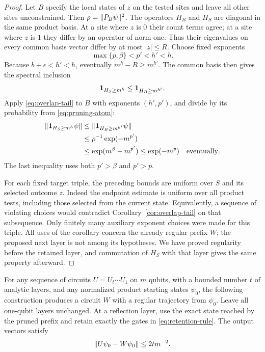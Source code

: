 \begin{proof}
Let $B$ specify the local states of $z$ on the tested sites and leave
all other sites unconstrained.  Then $\rho=\lVert P_B\psi\rVert^2$.
The operators $H_B$ and $H_S$ are diagonal in the same product basis.
At a site where $z$ is $0$ their count terms agree; at a site where
$z$ is $1$ they differ by an operator of norm one.  Thus their
eigenvalues on every common basis vector differ by at most
$|z|\le R$.  Choose fixed exponents
\[
 \max\{p,\beta\}<p'<h'<h.
\]
Because $b+\epsilon<h'<h$, eventually
$m^h-R\ge m^{h'}$.  The common basis then gives the spectral inclusion
\[
 \mathbf 1_{H_S\ge m^h}\le\mathbf 1_{H_B\ge m^{h'}}.
\]
Apply \eqref{eq:overlap-tail} to $B$ with exponents $(h',p')$, and
divide by its probability from \eqref{eq:pruning-atom}:
\begin{align*}
 \lVert\mathbf 1_{H_S\ge m^h}\psi\rVert
 &\le\lVert\mathbf 1_{H_B\ge m^{h'}}\psi\rVert\\
 &\le\rho^{-1}\exp(-m^{p'})\\
 &\le\exp(m^{\beta}-m^{p'})
 \le\exp(-m^p)
 \quad\text{eventually}.
\end{align*}
The last inequality uses both $p'>\beta$ and $p'>p$.

For each fixed target triple, the preceding bounds are uniform over
$S$ and its selected outcome $z$.  Indeed the endpoint estimate is
uniform over all product tests, including those selected from the
current state.  Equivalently, a sequence of violating choices would
contradict Corollary~\ref{cor:overlap-tail} on that subsequence.  Only
finitely many auxiliary exponent choices were made for this triple.
All uses of the corollary concern the already regular prefix $W$;
the proposed next layer is not among its hypotheses.  We have proved
regularity before the retained layer, and commutation of $H_S$ with
that layer gives the same property afterward.
\end{proof}

\begin{proposition}\label{prop:pruning}
For any sequence of circuits $U=U_t\cdots U_1$ on $m$ qubits, with a
bounded number $t$ of analytic layers, and any normalized product
starting states $\psi_0$, the following construction produces a
circuit $W$ with a regular trajectory from $\psi_0$.  Leave all
one-qubit layers unchanged.  At a reflection layer, use the exact
state reached by the pruned prefix and retain exactly the gates in
\eqref{eq:retention-rule}.  The output vectors satisfy
\begin{equation}\label{eq:pruning-error}
 \lVert U\psi_0-W\psi_0\rVert\le 2t m^{-2}.
\end{equation}
\end{proposition}

